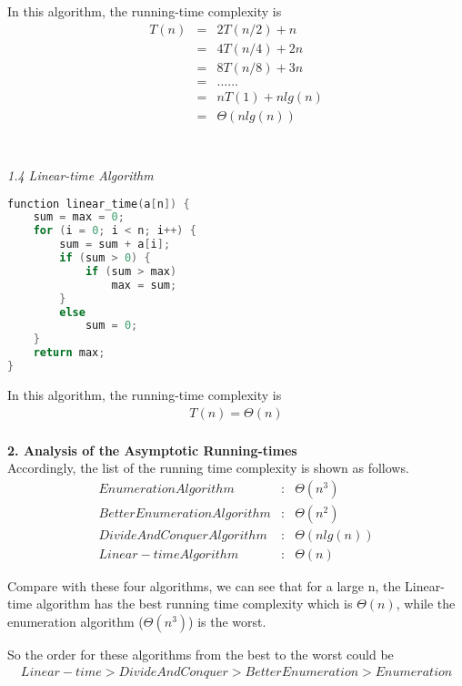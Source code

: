 \documentclass[11pt]{scrreprt}
\begin{document}
In this algorithm, the running-time complexity is
\begin{eqnarray*}
T(n) 	& = & 2T(n/2)+n\\
		& = & 4T(n/4)+2n\\
		& = & 8T(n/8)+3n\\
		& = & ......\\
		& = & nT(1)+nlg(n)\\
		& = & \Theta(nlg(n))\\\\\\\\\\
\end{eqnarray*}


\textit{1.4 Linear-time Algorithm}\\

\begin{lstlisting}[language=c]
function linear_time(a[n]) {
	sum = max = 0;
	for (i = 0; i < n; i++) {
		sum = sum + a[i];
		if (sum > 0) {
			if (sum > max)
				max = sum;
		}
		else
			sum = 0;
	}
	return max;
}
\end{lstlisting}

In this algorithm, the running-time complexity is
\begin{eqnarray*}
T(n) = \Theta(n)\\
\end{eqnarray*}

\textbf{2. Analysis of the Asymptotic Running-times}\\

Accordingly, the list of the running time complexity is shown as follows.
\begin{eqnarray*}
Enumeration Algorithm&:& \Theta(n^3)\\
Better Enumeration Algorithm&:& \Theta(n^2)\\
Divide And Conquer Algorithm&:& \Theta(nlg(n))\\
Linear-time Algorithm&:& \Theta(n)
\end{eqnarray*}

Compare with these four algorithms, we can see that for a large n, the Linear-time algorithm has the best running time complexity which is $\Theta(n)$, while the enumeration algorithm ($\Theta(n^3)$) is the worst.

So the order for these algorithms from the best to the worst could be 
\begin{eqnarray*}
Linear-time > Divide And Conquer > Better Enumeration > Enumeration
\end{eqnarray*}
\end{document}
